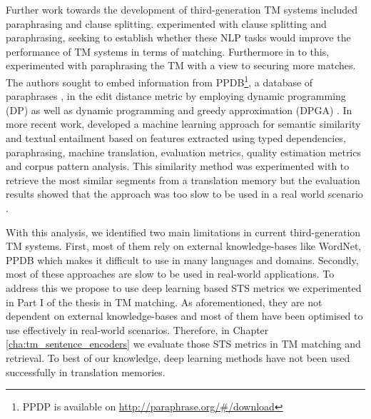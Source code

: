 Further work towards the development of third-generation TM systems included paraphrasing and clause splitting. \autocite{raisa-timonera-mitkov-2015-improving} experimented with clause splitting and paraphrasing, seeking to establish whether these NLP tasks would improve the performance of TM systems in terms of matching. Furthermore in to this, \autocite{Gupta2016} experimented with paraphrasing the TM with a view to securing more matches. The authors sought to embed information from PPDB\footnote{PPDP is available on \url{http://paraphrase.org/\#/download}}, a database of paraphrases \autocite{ganitkevitch-etal-2013-ppdb}, in the edit distance metric by employing dynamic programming (DP) \autocite{Gupta2016}  as well as dynamic programming and greedy approximation (DPGA) \autocite{10.1007/978-3-319-45510-5_30}. In more recent work, \autocite{gupta-etal-2014-uow} developed a machine learning approach for semantic similarity and textual entailment based on features extracted using typed dependencies, paraphrasing, machine translation, evaluation metrics, quality estimation metrics and corpus pattern analysis. This similarity method was experimented with to retrieve the most similar segments from a translation memory but the evaluation results showed that the approach was too slow to be used in a real world scenario \autocite{gupta2014intelligent}. 

With this analysis, we identified two main limitations in current third-generation TM systems. First, most of them rely on external knowledge-bases like WordNet, PPDB which makes it difficult to use in many languages and domains. Secondly, most of these approaches are slow to be used in real-world applications. To address this we propose to use deep learning based STS metrics we experimented in Part I of the thesis in TM matching. As aforementioned, they are not dependent on external knowledge-bases and most of them have been optimised to use effectively in real-world scenarios. Therefore, in Chapter \ref{cha:tm_sentence_encoders} we evaluate those STS metrics in TM matching and retrieval. To best of our knowledge, deep learning methods have not been used successfully in translation memories. 


